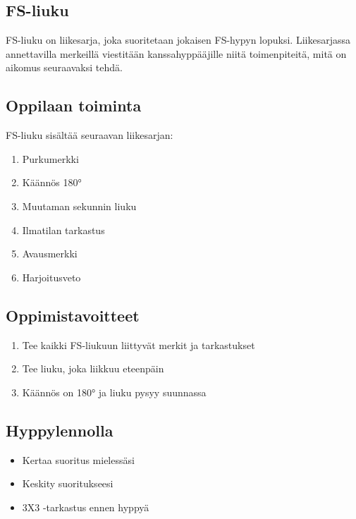 \begin{multicols}{2}
\section{ FS-liuku }
\label{peruskoulutuksen-muut-suoritukset-fs-liuku}


FS-liuku on liikesarja, joka suoritetaan jokaisen FS-hypyn lopuksi. Liikesarjassa annettavilla merkeillä viestitään kanssahyppääjille niitä toimenpiteitä, mitä on aikomus seuraavaksi tehdä. 

\subsection{ Oppilaan toiminta }
\label{peruskoulutuksen-muut-suoritukset-oppilaan-toiminta}


FS-liuku sisältää seuraavan liikesarjan: 

\begin{enumerate}[label=\bfseries \arabic*)]
\item Purkumerkki 
\item Käännös 180° 
\item Muutaman sekunnin liuku 
\item Ilmatilan tarkastus 
\item Avausmerkki 
\item Harjoitusveto 
\end{enumerate}
\subsection{ Oppimistavoitteet }
\label{peruskoulutuksen-muut-suoritukset-oppimistavoitteet}

\begin{enumerate}[label=\bfseries \arabic*)]
\item  Tee kaikki FS-liukuun liittyvät merkit ja tarkastukset 
\item  Tee liuku, joka liikkuu eteenpäin 
\item  Käännös on 180° ja liuku pysyy suunnassa 
\end{enumerate}
\subsection{ Hyppylennolla }
\label{peruskoulutuksen-muut-suoritukset-hyppylennolla}

\begin{itemize}
\item Kertaa suoritus mielessäsi 
\item Keskity suoritukseesi 
\item 3X3 -tarkastus ennen hyppyä 
\end{itemize}

\end{multicols}
